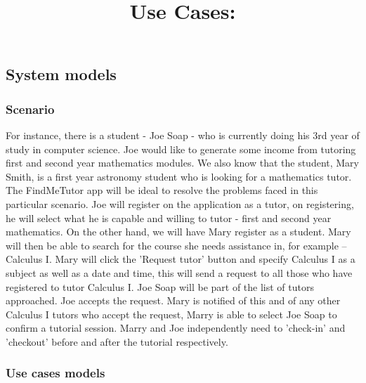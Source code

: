 \documentclass[12pt]{article}
\begin{document}
\subsection{System models}

\subsubsection{Scenario}
\begin{flushleft}

For instance, there is a student - Joe Soap - who is currently doing his 3rd year of study in computer science. Joe would like to generate some income from tutoring first and second year mathematics modules. We also know that the student, Mary Smith, is a first year astronomy student who is looking for a mathematics tutor. The FindMeTutor app will be ideal to resolve the problems faced in this particular scenario. Joe will register on the application as a tutor, on registering, he will select what he is capable and willing to tutor - first and second year mathematics. On the other hand, we will have Mary register as a student. Mary will then be able to search for the course she needs assistance in, for example – Calculus I. Mary will click the 'Request tutor' button and specify Calculus I as a subject as well as a date and time, this will send a request to all those who have registered to tutor Calculus I. Joe Soap will be part of the list of tutors approached. Joe accepts the request. Mary is notified of this and of any other Calculus I tutors who accept the request, Marry is able to select Joe Soap to confirm a tutorial session. Marry and Joe independently need to 'check-in' and 'checkout' before and after the tutorial respectively.
\end{flushleft}


\subsubsection{Use cases models}

\title{\textbf{Use Cases: }}\\ \\
\end{document}
